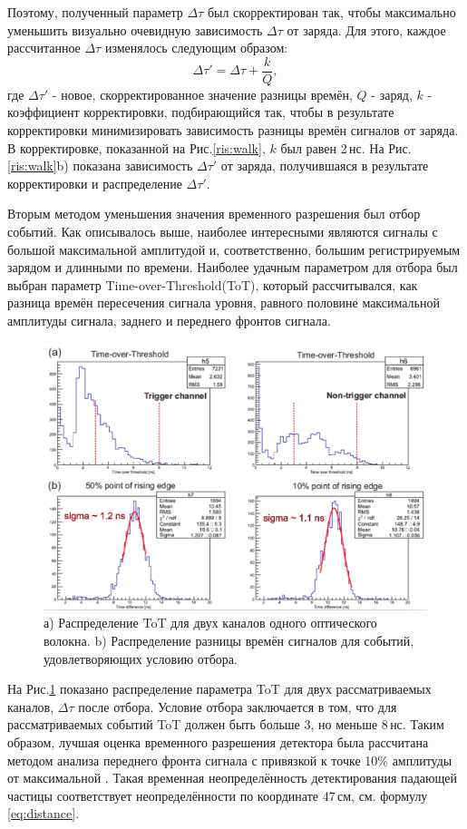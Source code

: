 Поэтому, полученный параметр $\Delta\tau$ был скорректирован так, чтобы максимально уменьшить визуально очевидную зависимость $\Delta\tau$ от заряда. Для этого, каждое рассчитанное $\Delta\tau$ изменялось следующим образом:
\begin{equation}
\Delta\tau' = \Delta\tau + \frac{k}{Q},
\end{equation}
где $\Delta\tau'$ - новое, скорректированное значение разницы времён, $Q$ - заряд, $k$ - коэффициент корректировки, подбирающийся так, чтобы в результате корректировки минимизировать зависимость разницы времён сигналов от заряда. В корректировке, показанной на Рис.\ref{ris:walk}, $k$ был равен 2\,нс.
На Рис.\ref{ris:walk}b) показана зависимость $\Delta\tau'$ от заряда, получившаяся в результате корректировки и распределение $\Delta\tau'$. 

Вторым методом уменьшения значения временного разрешения был отбор событий. Как описывалось выше, наиболее интересными являются сигналы с большой максимальной амплитудой и, соответственно, большим регистрируемым зарядом и длинными по времени. Наиболее удачным параметром для отбора был выбран параметр Time-over-Threshold(ToT), который рассчитывался, как разница времён пересечения сигнала уровня, равного половине максимальной амплитуды сигнала, заднего и переднего фронтов сигнала.

\begin{figure}[!h]
	\centering
	\includegraphics[width=0.8\linewidth]{totcorr.png}
	\caption{а) Распределение ToT для двух каналов одного оптического волокна. b) Распределение разницы времён сигналов для событий, удовлетворяющих условию отбора. }\label{ris:totcorr}
\end{figure}

На Рис.\ref{ris:totcorr} показано распределение параметра ToT для двух рассматриваемых каналов, $\Delta\tau$ после отбора. Условие отбора заключается в том, что для рассматриваемых событий ToT должен быть больше 3, но меньше 8\,нс.
Таким образом, лучшая оценка временного разрешения детектора была рассчитана методом анализа переднего фронта сигнала с привязкой к точке 10\% амплитуды от максимальной . Такая временная неопределённость детектирования падающей частицы соответствует неопределённости по координате 47\,см, см. формулу\,\ref{eq:distance}. 

